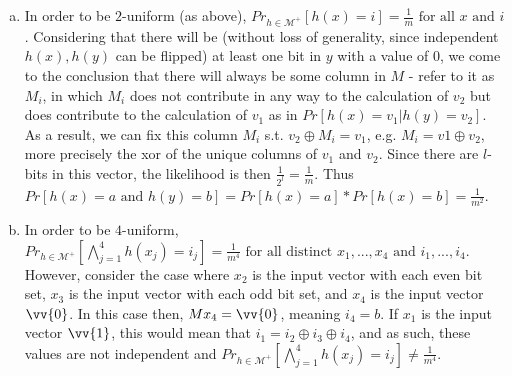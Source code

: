 \documentclass[11pt]{article}
\begin{document}
\begin{enumerate}[(a)]
\item
\begin{solution}
    In order to be $2$-uniform (as above), $Pr_{h \in \mathcal{M^+}}[h(x) = i] = \frac{1}{m} \text{ for all } x \text{ and } i$. Considering that there will be (without loss of generality, since independent $h(x),h(y)$ can be flipped) at least one bit in $y$ with a value of $0$, we come to the conclusion that there will always be some column in $M$ - refer to it as $M_i$, in which $M_i$ does not contribute in any way to the calculation of $v_2$ but does contribute to the calculation of $v_1$ as in $Pr[h(x) = v_1 | h(y) = v_2]$. As a result, we can fix this column $M_i$ s.t. $v_2 \oplus M_i = v_1$, e.g. $M_i = v1 \oplus v_2$, more precisely the xor of the unique columns of $v_1$ and $v_2$. Since there are $l$-bits in this vector, the likelihood is then $\frac{1}{2^l} = \frac{1}{m}$. Thus $Pr[h(x) = a \text{ and } h(y) = b] = Pr[h(x) = a] * Pr[h(x) = b] = \frac{1}{m^2}$.
\end{solution}

\item
\begin{solution}

\end{solution}
        In order to be $4$-uniform, $Pr_{h \in \mathcal{M}^+}[\bigwedge_{j=1}^{4} h(x_j) = i_j] = \frac{1}{m^4} \text{ for all distinct } x_1,...,x_4 \text{ and } i_1,...,i_4$. However, consider the case where $x_2$ is the input vector with each even bit set, $x_3$ is the input vector with each odd bit set, and $x_4$ is the input vector $\vv{0}$. In this case then, $Mx_4 = \vv{0}$, meaning $i_4 = b$. If $x_1$ is the input vector $\vv{1}$, this would mean that $i_1 = i_2 \oplus i_3 \oplus i_4$, and as such, these values are not independent and $Pr_{h \in \mathcal{M}^+}[\bigwedge_{j=1}^{4} h(x_j) = i_j] \neq \frac{1}{m^4}$.
\end{enumerate}

\clearpage
\end{document}
